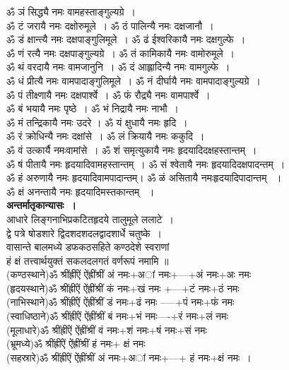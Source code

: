 \documentclass[twoside,top=1.7cm, bottom=1.7cm, outer=1cm,landscape, inner=1.5cm,a5paper,]{book}
\begin{document}
ॐ ञं सिद्ध्यै नमः वामहस्ताङ्गुल्यग्रे~।\\
ॐ टं जरायै नमः दक्षोरुमूले~।
ॐ ठं पालिन्यै नमः दक्षजानौ~।\\
ॐ डं क्षान्त्यै नमः दक्षपाङ्गुलिमूले~।
ॐ ढं ईश्वरिकायै नमः दक्षगुल्फे~।\\
ॐ णं रत्यै नमः दक्षपाङ्गुल्यग्रे~।
ॐ तं कामिकायै नमः  वामोरुमूले~।\\
ॐ थं वरदायै नमः वामजानुनि~।
ॐ दं आह्लादिन्यै नमः वामगुल्फे~।\\
ॐ धं प्रीत्यै नमः वामपादाङ्गुलिमूले~।
ॐ नं दीर्घायै नमः वामपादाङ्गुल्यग्रे~।\\
ॐ पं तीक्ष्णायै नमः दक्षपार्श्वे~।
ॐ फं रौद्र्यै नमः  वामपार्श्वे~।\\
ॐ बं भयायै नमः  पृष्ठे~।
ॐ भं निद्रायै नमः नाभौ~।\\
ॐ मं तन्द्रिकायै नमः उदरे ।
ॐ यं क्षुधायै नमः हृदि~।\\
ॐ रं क्रोधिन्यै नमः दक्षांसे~।  
ॐ लं क्रियायै नमः ककुदि~।\\
ॐ वं उत्कार्यै नमःवामांसे~।
ॐ शं समृत्युकायै नमः  हृदयादिदक्षहस्तान्तम्~।\\
ॐ षं पीतायै नमः हृदयादिवामहस्तान्तम्~।
ॐ सं श्वेतायै नमः हृदयादिदक्षपादन्तम्~।\\
ॐ हं अरुणायै नमः हृदयादिवामपादान्तम्।
ॐ ळं असितायै नमःहृदयादिपादान्तम् ~।\\
ॐ क्षं अनन्तायै नमः हृदयादिमस्तकान्तम् ~।\\[10pt]
{\bfseries अन्तर्मातृकान्यासः~।}\\
आधारे लिङ्गनाभिप्रकटितहृदये तालुमूले ललाटे~।\\
     द्वे पत्रे षोडशारे द्विदशदशदलद्वादशार्धे चतुष्के~।\\
वासान्ते बालमध्ये डफकठसहिते कण्ठदेशे स्वराणां\\
     हं क्षं तत्त्वार्थयुक्तं सकलदलगतं वर्णरूपं नमामि ॥\\[10pt]
(कण्ठस्थाने)ॐ श्रींह्रींऐं ऐंह्रींश्रीं अं नमः+अां नमः+---+अं नमः+अः नमः\\
(हृदयस्थाने)ॐ श्रींह्रींऐं ऐंह्रींश्रीं  कं नमः+खं नमः +---+टं नमः+ठं नमः  \\
(नाभिस्थाने)ॐ श्रींह्रींऐं ऐंह्रींश्रीं  डं नमः+ढं नमः -----+पं नमः+फं नमः \\
(स्वाधिष्ठाने)ॐ श्रींह्रींऐं ऐंह्रींश्रीं  बं नमः+भं नमः----+रं नमः+लं नमः \\
(मूलाधारे)ॐ श्रींह्रींऐं ऐंह्रींश्रीं  वं नमः+शं नमः+षं नमः+सं नमः \\
(भ्रूमध्ये)ॐ श्रींह्रींऐं ऐंह्रींश्रीं  हं नमः+ क्षं नमः\\
(सहस्रारे)ॐ श्रींह्रींऐं ऐंह्रींश्रीं अं नमः+अां नमः+---+ हं नमः+क्षं नमः~।\\
\end{document}
